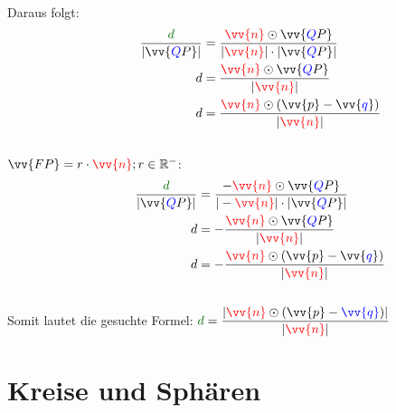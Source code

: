 \documentclass[main.tex]{subfiles}
\begin{document}
\begin{Beweis}
            \paragraph{} Daraus folgt:
            \begin{align*}
                \qquad \qquad \dfrac{\textcolor{gree}{d}}{|\vv{\textcolor{blue}{Q}P}|} &= \dfrac{\textcolor{red}{\vv{n}} \odot \vv{\textcolor{blue}{Q}P}}{|\textcolor{red}{\vv{n}}| \cdot |\vv{\textcolor{blue}{Q}P}|} \\
                                                                                     d &= \dfrac{\textcolor{red}{\vv{n}} \odot \vv{\textcolor{blue}{Q}P}}{|\textcolor{red}{\vv{n}}|} \\
                                                                                     d &= \dfrac{\textcolor{red}{\vv{n}} \odot (\vv{p} - \vv{\textcolor{blue}{q}})}{|\textcolor{red}{\vv{n}}|} \\
            \end{align*}
            \\
            \underline{$\vv{FP} = r \cdot \textcolor{red}{\vv{n}} ; r \in \R^{-}$}:
            \begin{align*}
                \qquad \qquad \dfrac{\textcolor{gree}{d}}{|\vv{\textcolor{blue}{Q}P}|} &= \dfrac{-\textcolor{red}{\vv{n}} \odot \vv{\textcolor{blue}{Q}P}}{|-\textcolor{red}{\vv{n}}| \cdot |\vv{\textcolor{blue}{Q}P}|} \\
                                                                                     d &= -\dfrac{\textcolor{red}{\vv{n}} \odot \vv{\textcolor{blue}{Q}P}}{|\textcolor{red}{\vv{n}}|} \\
                                                                                     d &= -\dfrac{\textcolor{red}{\vv{n}} \odot (\vv{p} - \vv{\textcolor{blue}{q}})}{|\textcolor{red}{\vv{n}}|} \\
            \end{align*}
            \\
            Somit lautet die gesuchte Formel: $\textcolor{gree}{d} = \dfrac{|\textcolor{red}{\vv{n}} \odot (\vv{p} - \textcolor{blue}{\vv{q}})|}{|\textcolor{red}{\vv{n}}|}$
        \end{Beweis}




\section{Kreise und Sphären}
\end{document}
